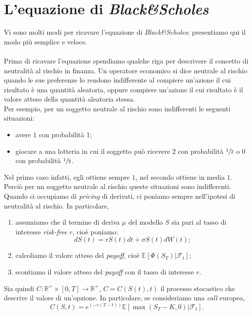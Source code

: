 \documentclass[a4paper,10pt]{report}
\theoremstyle{plain}
\theoremstyle{definition}
\theoremstyle{remark}
\begin{document}
\section{L'equazione di \emph{Black\&Scholes}}
Vi sono molti modi per ricavare l'equazione di \emph{Black\&Scholes}: presentiamo qui il modo pi\`u semplice e veloce.\\\\Prima di ricavare l'equazione spendiamo qualche riga per descrivere il concetto di neutralit\`a al rischio in finanza. Un operatore economico si dice neutrale al rischio quando le sue preferenze lo rendono indifferente al compiere un'azione il cui risultato \`e una quantit\`a aleatoria, oppure compiere un'azione il cui risultato \`e il valore atteso della quantit\`a aleatoria stessa.\\Per esempio, per un soggetto neutrale al rischio sono indifferenti le seguenti situazioni:
\begin{itemize}
\item avere $1$\officialeuro$ $ con probabilit\`a 1;
\item giocare a una lotteria in cui il soggetto pu\`o ricevere $2$\officialeuro$ $ con probabilit\`a $\sfrac{1}{2}$ o $0$\officialeuro$ $ con probabilit\`a $\sfrac{1}{2}$.
\end{itemize}
Nel primo caso infatti, egli ottiene sempre $1$\officialeuro$ $, nel secondo ottiene in media $1$\officialeuro$ $. Perci\`o per un soggetto neutrale al rischio queste situazioni sono indifferenti.\\Quando ci occupiamo di \emph{pricing} di derivati, ci poniamo sempre nell'ipotesi di neutralit\`a al rischio. In particolare,
\begin{enumerate}
\item assumiamo che il termine di deriva $\mu$ del modello $S$ sia pari al tasso di interesse \emph{risk-free} $r$, cio\`e poniamo: $$dS(t)=rS(t)dt+\sigma S(t)dW(t);$$
\item calcoliamo il valore atteso del \emph{payoff}, cio\`e $\mathbb{E}\left[\Phi(S_T)|\mathcal{F}_t\right]$;
\item scontiamo il valore atteso del \emph{payoff} con il tasso di interesse $r$.
\end{enumerate}
Sia quindi $C:\mathbb{R}^+\times[0,T]\rightarrow\mathbb{R}^+$, $C=C(S(t),t)$ il processo stocastico che descrive il valore di un'opzione. In particolare,
se consideriamo una \emph{call} europea,
$$C(S,t)=e^{(-r(T-t))}\mathbb{E}\left[\max(S_T-K,0)|\mathcal{F}_t\right].$$
\end{document}
